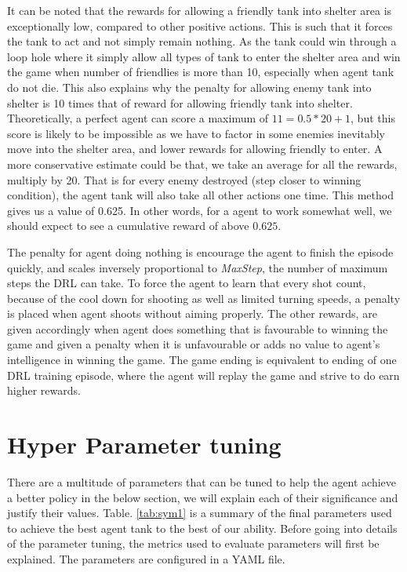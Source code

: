 It can be noted that the rewards for allowing a friendly tank into shelter area is exceptionally low, compared to other positive actions. This is such that it forces the tank to act and not simply remain nothing. As the tank could win through a loop hole where it simply allow all types of tank to enter the shelter area and win the game when number of friendlies is more than 10, especially when agent tank do not die. This also explains why the penalty for allowing enemy tank into shelter is 10 times that of reward for allowing friendly tank into shelter. Theoretically, a perfect agent can score a maximum of $11 = 0.5*20 + 1$, but this score is likely to be impossible as we have to factor in some enemies inevitably move into the shelter area, and lower rewards for allowing friendly to enter. A more conservative estimate could be that, we take an average for all the rewards, multiply by 20. That is for every enemy destroyed (step closer to winning condition), the agent tank will also take all other actions one time. This method gives us a value of 0.625. In other words, for a agent to work somewhat well, we should expect to see a cumulative reward of above $0.625$.

The penalty for agent doing nothing is encourage the agent to finish the episode quickly, and scales inversely proportional to \textit{MaxStep}, the number of maximum steps the DRL can take. To force the agent to learn that every shot count, because of the cool down for shooting as well as limited turning speeds, a penalty is placed when agent shoots without aiming properly. The other rewards, are given accordingly when agent does something that is favourable to winning the game and given a penalty when it is unfavourable or adds no value to agent's intelligence in winning the game. The game ending is equivalent to ending of one DRL training episode, where the agent will replay the game and strive to do earn higher rewards.


\section{Hyper Parameter tuning}
There are a multitude of parameters that can be tuned to help the agent achieve a better policy in the below section, we will explain each of their significance and justify their values. Table. \ref{tab:sym1} is a summary of the final parameters used to achieve the best agent tank to the best of our ability. Before going into details of the parameter tuning, the metrics used to evaluate parameters will first be explained. The parameters are configured in a YAML \cite{ben2009yaml} file. 

